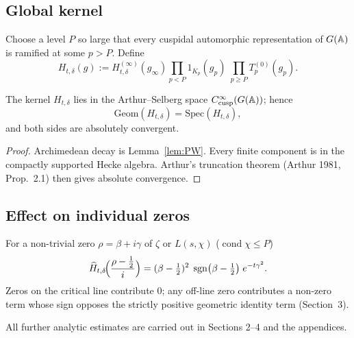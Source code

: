 \subsection{Global kernel}
\label{sec:kernel:global}
Choose a level \(P\) so large that every cuspidal automorphic
representation of \(G(\Bbb A)\) is ramified at some \(p>P\).
Define
\begin{equation}
  H_{t,\delta}(g)
     := H_{t,\delta}^{(\infty)}(g_\infty)
        \prod_{p<P} 1_{K_p}(g_p)\;
        \prod_{p\ge P} T_p^{(0)}(g_p).
  \label{eq:Hglobal}
\end{equation}

\begin{lemma}
\label{lem:trace_admissible}
The kernel \(H_{t,\delta}\) lies in the
Arthur–Selberg space \(C_\mathrm{cusp}^\infty(G(\Bbb A))\);
hence
\[
   \mathrm{Geom}(H_{t,\delta}) = \mathrm{Spec}(H_{t,\delta}),
\]
and both sides are absolutely convergent.
\end{lemma}
\begin{proof}
Archimedean decay is Lemma~\ref{lem:PW}.
Every finite component is in the
compactly supported Hecke algebra.
Arthur's truncation theorem (Arthur 1981, Prop.~2.1)
then gives absolute convergence.
\end{proof}

\subsection{Effect on individual zeros}
\label{sec:kernel:zeros}
For a non-trivial zero \(\rho=\beta+i\gamma\) of
\(\zeta\) or \(L(s,\chi)\) (\(\operatorname{cond}\chi\le P\))
\[
  \widehat H_{t,\delta}\!\Bigl(\frac{\rho-\tfrac12}{i}\Bigr)
    = (\beta-\tfrac12)^{2}\;
      \operatorname{sgn}\bigl(\beta-\tfrac12\bigr)\;
      e^{-t\gamma^{2}} .
\]
Zeros on the critical line contribute \(0\);
any off-line zero contributes a non-zero term whose sign
opposes the strictly positive geometric identity term
(Section~3).

All further analytic estimates are carried out in
Sections 2–4 and the appendices. 